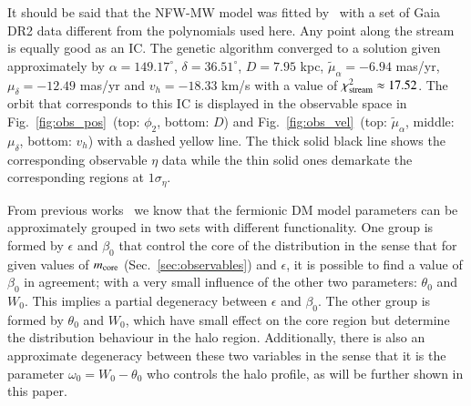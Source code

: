 \documentclass[twocolumn]{aa}
\begin{document}
It should be said that the NFW-MW model was fitted by~\citet{2019MNRAS.486.2995M} with a set of Gaia
DR2 data different from the polynomials used here. Any point along the stream is equally good as an IC. The genetic algorithm converged to a solution given approximately by
$\alpha=149.17^{\circ}$, $\delta=36.51^{\circ}$, $D=7.95$ kpc, $\tilde{\mu}_\alpha=-6.94$ mas/yr, $\mu_\delta=-12.49$ mas/yr and $v_h=-18.33$ km/s with a value of $\chi^2_{\rm{stream}}\approx 17.52$.
The orbit that corresponds to this IC is displayed in the observable space in Fig.~\ref{fig:obs_pos}~(top: $\phi_2$, bottom: $D$) and Fig.~\ref{fig:obs_vel}~(top: $\tilde{\mu}_\alpha$, middle: $\mu_\delta$, bottom: $v_h$) with a dashed yellow line. The thick solid black line shows the corresponding observable $\eta$ data
while the thin solid ones demarkate the corresponding regions at $1\sigma_\eta$.

From previous works~\citep{arguelles_novel_2018,2019PDU....24..278A,2023ApJ...945....1K} we know that the fermionic DM model parameters can be approximately grouped in two sets with different functionality. One group is formed
by $\epsilon$ and $\beta_0$ that control the core of the distribution in the sense that
for given values of $m_{\rm{core}}$ (Sec.~\ref{sec:observables}) and $\epsilon$, it is possible to find a value of $\beta_0$ in agreement; with a very small influence of the other two parameters: $\theta_0$ and $W_0$. This implies a partial degeneracy between $\epsilon$ and $\beta_0$.
The other group is formed by $\theta_0$ and $W_0$, which have small effect on the core region but
determine the distribution behaviour in the halo region. Additionally, there is also an approximate
degeneracy between these two variables in the sense that it is the parameter
$\omega_0 = W_0-\theta_0$ who controls the halo profile, as will be further shown in this paper.
\end{document}
